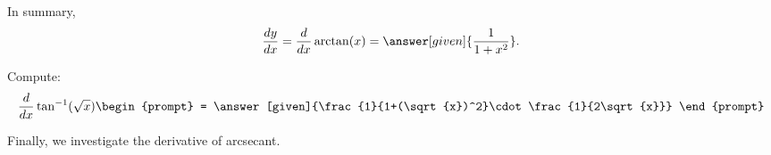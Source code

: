 \documentclass{ximera}
\begin{document}
\begin{theorem}
\begin{explanation}
In summary,
\[
\frac{dy}{dx} = \frac{d}{dx} \arctan(x) = \answer[given]{\frac{1}{1+x^2}}.
\]
\end{explanation}
\end{theorem}

\begin{question}
  Compute:
  \[
  \frac{d}{dx} \tan^{-1}(\sqrt{x})
  \begin{prompt}
    = \answer[given]{\frac{1}{1+(\sqrt{x})^2}\cdot\frac{1}{2\sqrt{x}}}
  \end{prompt}
  \]
\end{question}



Finally, we investigate the derivative of arcsecant.
\end{document}
